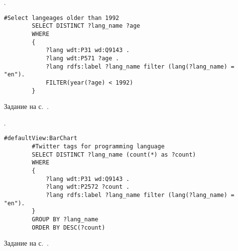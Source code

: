 \begin{task}
    \label{answer:prog_langs_5}
    . 
	\begin{lstlisting}[language=SPARQL, caption={{Языки программирования, старше 1992 года}\protect\footnotemark}, label=lst:prog_lang_answer_5]
		#Select langeages older than 1992
		SELECT DISTINCT ?lang_name ?age
		WHERE
		{
		    ?lang wdt:P31 wd:Q9143 .
		    ?lang wdt:P571 ?age .
		    ?lang rdfs:label ?lang_name filter (lang(?lang_name) = "en").
		    FILTER(year(?age) < 1992)
		}
	\end{lstlisting}
    
    \small{Задание на с.~\pageref{prog_lang_test}.}
\end{task}

\begin{task}
    \label{answer:prog_langs_6}
    . 
	\begin{lstlisting}[language=SPARQL, caption={{Хештеги языков программирования в Твиттере}\protect\footnotemark}, label=lst:prog_lang_answer_6]
		#defaultView:BarChart
		#Twitter tags for programming language
		SELECT DISTINCT ?lang_name (count(*) as ?count)
		WHERE
		{
		    ?lang wdt:P31 wd:Q9143 .
		    ?lang wdt:P2572 ?count .
		    ?lang rdfs:label ?lang_name filter (lang(?lang_name) = "en"). 
		} 
		GROUP BY ?lang_name 
		ORDER BY DESC(?count)
	\end{lstlisting}
    
    \small{Задание на с.~\pageref{prog_lang_test}.}
\end{task}




